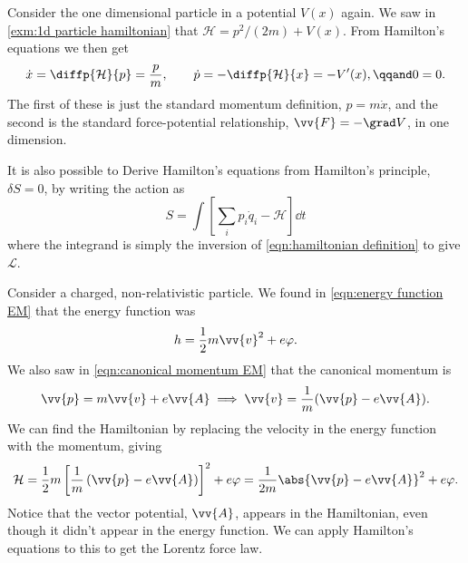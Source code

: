 \documentclass[fleqn]{NotesClass}
\newcommand*{\lagrangian}{\mathcal{L}}
\newcommand*{\hamiltonian}{\mathcal{H}}
\begin{document}
    \begin{exm}{}{}
        Consider the one dimensional particle in a potential \(V(x)\) again.
        We saw in \cref{exm:1d particle hamiltonian} that \(\hamiltonian = p^2/(2m) + V(x)\).
        From Hamilton's equations we then get
        \begin{equation}
            \dot{x} = \diffp{\hamiltonian}{p} = \frac{p}{m}, \qquad \dot{p} = -\diffp{\hamiltonian}{x} = -V'(x), \qqand 0 = 0.
        \end{equation}
        The first of these is just the standard momentum definition, \(p = m\dot{x}\), and the second is the standard force-potential relationship, \(\vv{F} = -\grad V\), in one dimension.
    \end{exm}
    
    It is also possible to Derive Hamilton's equations from Hamilton's principle, \(\delta S = 0\), by writing the action as
    \begin{equation}
        S = \int \left[ \sum_i p_i\dot{q}_i - \hamiltonian \right] \dd{t}
    \end{equation}
    where the integrand is simply the inversion of \cref{eqn:hamiltonian definition} to give \(\lagrangian\).
    
    \begin{exm}{}{}
        Consider a charged, non-relativistic particle.
        We found in \cref{eqn:energy function EM} that the energy function was
        \begin{equation}
            h = \frac{1}{2}m\vv{v}^2 + e\varphi.
        \end{equation}
        We also saw in \cref{eqn:canonical momentum EM} that the canonical momentum is
        \begin{equation}
            \vv{p} = m\vv{v} + e\vv{A} \implies \vv{v} = \frac{1}{m}(\vv{p} - e\vv{A}).
        \end{equation}
        We can find the Hamiltonian by replacing the velocity in the energy function with the momentum, giving
        \begin{equation}
            \hamiltonian = \frac{1}{2}m\left[ \frac{1}{m}\left( \vv{p} - e\vv{A} \right) \right]^2 + e\varphi = \frac{1}{2m}\abs{\vv{p} - e\vv{A}}^2 + e\varphi.
        \end{equation}
        Notice that the vector potential, \(\vv{A}\), appears in the Hamiltonian, even though it didn't appear in the energy function.
        We can apply Hamilton's equations to this to get the Lorentz force law.
    \end{exm}
    
\end{document}
